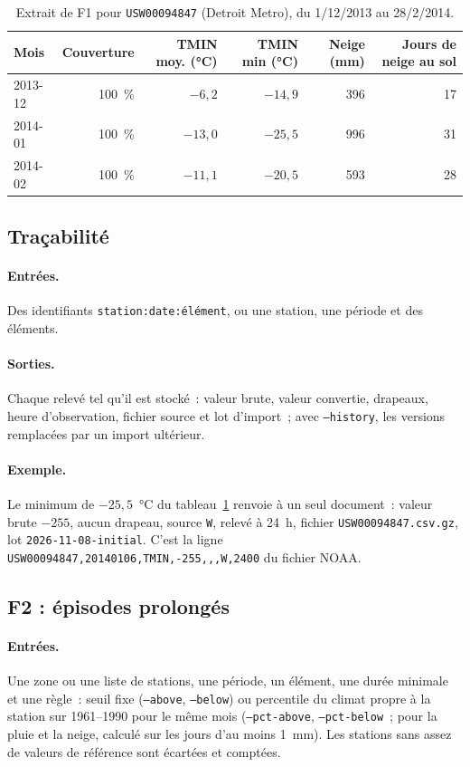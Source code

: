 \begin{table}[h!]
  \centering
  \small
  \begin{tabular}{lrrrrr}
    \hline
    Mois & Couverture & TMIN moy. (°C) & TMIN min (°C) & Neige (mm) & Jours de neige au sol \\
    \hline
    2013-12 & 100~\% & $-6,2$ & $-14,9$ & 396 & 17 \\
    2014-01 & 100~\% & $-13,0$ & $-25,5$ & 996 & 31 \\
    2014-02 & 100~\% & $-11,1$ & $-20,5$ & 593 & 28 \\
    \hline
  \end{tabular}
  \caption{Extrait de F1 pour \texttt{USW00094847} (Detroit Metro), du 1/12/2013 au 28/2/2014.}
  \label{tab:f1}
\end{table}

\subsection{Traçabilité}
\paragraph{Entrées.} Des identifiants \texttt{station:date:élément}, ou une station, une période et des éléments.
\paragraph{Sorties.} Chaque relevé tel qu'il est stocké~: valeur brute, valeur convertie, drapeaux, heure d'observation, fichier source et lot d'import~; avec \texttt{--history}, les versions remplacées par un import ultérieur.
\paragraph{Exemple.} Le minimum de $-25,5$~°C du tableau~\ref{tab:f1} renvoie à un seul document~: valeur brute $-255$, aucun drapeau, source \texttt{W}, relevé à 24~h, fichier \texttt{USW00094847.csv.gz}, lot \texttt{2026-11-08-initial}. C'est la ligne \texttt{USW00094847,20140106,TMIN,-255,,,W,2400} du fichier NOAA.

\subsection{F2 : épisodes prolongés}
\paragraph{Entrées.} Une zone ou une liste de stations, une période, un élément, une durée minimale et une règle~: seuil fixe (\texttt{--above}, \texttt{--below}) ou percentile du climat propre à la station sur 1961--1990 pour le même mois (\texttt{--pct-above}, \texttt{--pct-below}~; pour la pluie et la neige, calculé sur les jours d'au moins 1~mm). Les stations sans assez de valeurs de référence sont écartées et comptées.
